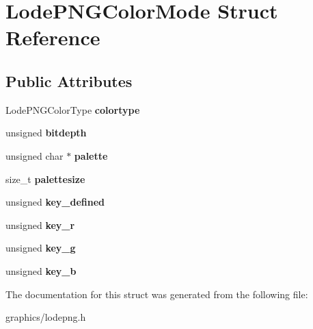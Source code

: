 \hypertarget{struct_lode_p_n_g_color_mode}{\section{Lode\+P\+N\+G\+Color\+Mode Struct Reference}
\label{struct_lode_p_n_g_color_mode}
}
\subsection*{Public Attributes}
\begin{DoxyCompactItemize}
\item 
\hypertarget{struct_lode_p_n_g_color_mode_a4f3df7240411abe80546052d197fbe8d}{Lode\+P\+N\+G\+Color\+Type {\bfseries colortype}}\label{struct_lode_p_n_g_color_mode_a4f3df7240411abe80546052d197fbe8d}

\item 
\hypertarget{struct_lode_p_n_g_color_mode_ad20010b9561980f65281bc17f7848253}{unsigned {\bfseries bitdepth}}\label{struct_lode_p_n_g_color_mode_ad20010b9561980f65281bc17f7848253}

\item 
\hypertarget{struct_lode_p_n_g_color_mode_a54f0a793238009fcb95f081626fae308}{unsigned char $\ast$ {\bfseries palette}}\label{struct_lode_p_n_g_color_mode_a54f0a793238009fcb95f081626fae308}

\item 
\hypertarget{struct_lode_p_n_g_color_mode_a407557f056168682d9319aeb60866dcc}{size\+\_\+t {\bfseries palettesize}}\label{struct_lode_p_n_g_color_mode_a407557f056168682d9319aeb60866dcc}

\item 
\hypertarget{struct_lode_p_n_g_color_mode_ab9105505c5d56cfc6ce4efe1bb288b54}{unsigned {\bfseries key\+\_\+defined}}\label{struct_lode_p_n_g_color_mode_ab9105505c5d56cfc6ce4efe1bb288b54}

\item 
\hypertarget{struct_lode_p_n_g_color_mode_a29e64327bca1f3d16235e9ff471e4d50}{unsigned {\bfseries key\+\_\+r}}\label{struct_lode_p_n_g_color_mode_a29e64327bca1f3d16235e9ff471e4d50}

\item 
\hypertarget{struct_lode_p_n_g_color_mode_ad98309f36d289392b0c440baa50af9f6}{unsigned {\bfseries key\+\_\+g}}\label{struct_lode_p_n_g_color_mode_ad98309f36d289392b0c440baa50af9f6}

\item 
\hypertarget{struct_lode_p_n_g_color_mode_a93a269405fee0d1c5045a1a671ed1de8}{unsigned {\bfseries key\+\_\+b}}\label{struct_lode_p_n_g_color_mode_a93a269405fee0d1c5045a1a671ed1de8}

\end{DoxyCompactItemize}


The documentation for this struct was generated from the following file\+:\begin{DoxyCompactItemize}
\item 
graphics/lodepng.\+h\end{DoxyCompactItemize}
